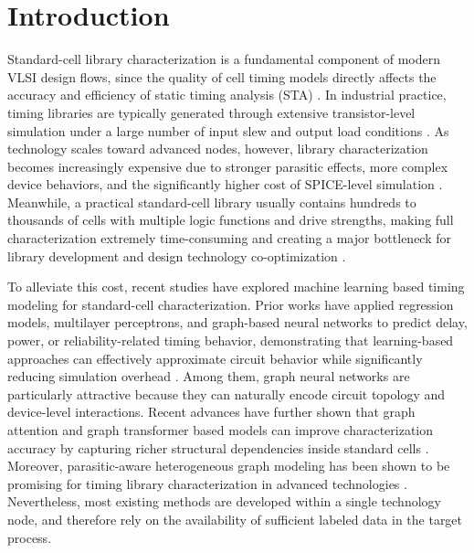 \section{Introduction}
Standard-cell library characterization is a fundamental component of modern VLSI design flows, since the quality of cell timing models directly affects the accuracy and efficiency of static timing analysis (STA) \cite{bhasker2009sta}. In industrial practice, timing libraries are typically generated through extensive transistor-level simulation under a large number of input slew and output load conditions \cite{garyfallou2021gate,charafeddine2017curve}. As technology scales toward advanced nodes, however, library characterization becomes increasingly expensive due to stronger parasitic effects, more complex device behaviors, and the significantly higher cost of SPICE-level simulation \cite{amelifard2008csm,kaur2014ecsm}. Meanwhile, a practical standard-cell library usually contains hundreds to thousands of cells with multiple logic functions and drive strengths, making full characterization extremely time-consuming and creating a major bottleneck for library development and design technology co-optimization \cite{ma2024gnn,liu2025gtncell}.

To alleviate this cost, recent studies have explored machine learning based timing modeling for standard-cell characterization. Prior works have applied regression models, multilayer perceptrons, and graph-based neural networks to predict delay, power, or reliability-related timing behavior, demonstrating that learning-based approaches can effectively approximate circuit behavior while significantly reducing simulation overhead \cite{klemme2021reliability,garyfallou2022ml,ebrahimipour2020aadam}. Among them, graph neural networks are particularly attractive because they can naturally encode circuit topology and device-level interactions. Recent advances have further shown that graph attention and graph transformer based models can improve characterization accuracy by capturing richer structural dependencies inside standard cells \cite{ma2024gnn,ye2024aging,liu2025gtncell,velivckovic2018gat}. Moreover, parasitic-aware heterogeneous graph modeling has been shown to be promising for timing library characterization in advanced technologies \cite{cheng2024hgat}. Nevertheless, most existing methods are developed within a single technology node, and therefore rely on the availability of sufficient labeled data in the target process.


